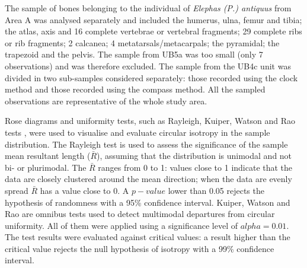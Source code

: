 \documentclass[review,authoryear,times]{elsarticle} %
\begin{document}
The sample of bones belonging to the individual of \emph{Elephas (P.) antiquus} from Area A was analysed separately and included the humerus, ulna, femur and tibia; the atlas, axis and 16 complete vertebrae or vertebral fragments; 29 complete ribs or rib fragments; 2 calcanea; 4 metatarsals/metacarpals; the pyramidal; the trapezoid and the pelvis. The sample from UB5a was too small (only 7 observations) and was therefore excluded. The sample from the UB4c unit was divided in two sub-samples considered separately: those recorded using the clock method and those recorded using the compass method. All the sampled observations are representative of the whole study area.

\begin{table}[]
  \caption{List of sampled observations for the fabric analysis.}
  \label{tab:1}
  \vspace{0.1in}
\end{table}

Rose diagrams and uniformity tests, such as Rayleigh, Kuiper, Watson and Rao tests \citep{Jammalamadaka2001}, were used to visualise and evaluate circular isotropy in the sample distribution. The Rayleigh test is used to assess the significance of the sample mean resultant length ($\bar{R}$), assuming that the distribution is unimodal and not bi- or plurimodal. The $\bar{R}$ ranges from 0 to 1: values close to 1 indicate that the data are closely clustered around the mean direction; when the data are evenly spread $\bar{R}$ has a value close to 0. A $p-value$ lower than 0.05 rejects the hypothesis of randomness with a 95\% confidence interval. Kuiper, Watson and Rao are omnibus tests used to detect multimodal departures from circular uniformity. All of them were applied using a significance level of $alpha=0.01$. The test results were evaluated against critical values: a result higher than the critical value rejects the null hypothesis of isotropy with a 99\% confidence interval.
\end{document}

